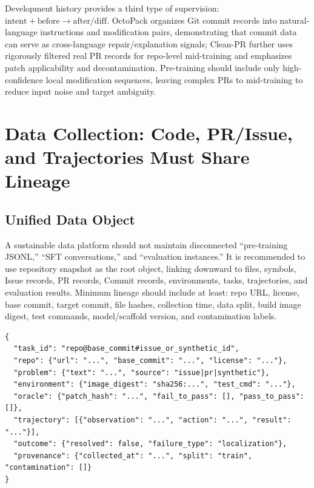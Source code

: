 \documentclass[10pt,a4paper,UTF8,fontset=none]{ctexart}
\newcommand{\ident}[1]{{\rmfamily #1}}
\begin{document}
Development history provides a third type of supervision: $\text{intent} + \text{before} \rightarrow \text{after/diff}$. OctoPack organizes Git commit records into natural-language instructions and modification pairs, demonstrating that commit data can serve as cross-language repair/explanation signals\cite{en:muennighoff2023octopack}; Clean-PR further uses rigorously filtered real PR records for repo-level mid-training and emphasizes patch applicability and decontamination\cite{en:lo2026cleanpr}. Pre-training should include only high-confidence local modification sequences, leaving complex PRs to mid-training to reduce input noise and target ambiguity.

\section{Data Collection: Code, PR/Issue, and Trajectories Must Share Lineage}

\subsection{Unified Data Object}

A sustainable data platform should not maintain disconnected ``pre-training JSONL,'' ``SFT conversations,'' and ``evaluation instances.'' It is recommended to use \ident{repository snapshot} as the root object, linking downward to files, symbols, Issue records, PR records, Commit records, environments, tasks, trajectories, and evaluation results. Minimum lineage should include at least: repo URL, license, base commit, target commit, file hashes, collection time, data split, build image digest, test commands, model/scaffold version, and contamination labels.

\begin{lstlisting}[style=codeblock,caption={Recommended Unified Task and Trajectory Record (Illustrative)},label={en:lst:schema}]
{
  "task_id": "repo@base_commit#issue_or_synthetic_id",
  "repo": {"url": "...", "base_commit": "...", "license": "..."},
  "problem": {"text": "...", "source": "issue|pr|synthetic"},
  "environment": {"image_digest": "sha256:...", "test_cmd": "..."},
  "oracle": {"patch_hash": "...", "fail_to_pass": [], "pass_to_pass": []},
  "trajectory": [{"observation": "...", "action": "...", "result": "..."}],
  "outcome": {"resolved": false, "failure_type": "localization"},
  "provenance": {"collected_at": "...", "split": "train", "contamination": []}
}
\end{lstlisting}
\end{document}
